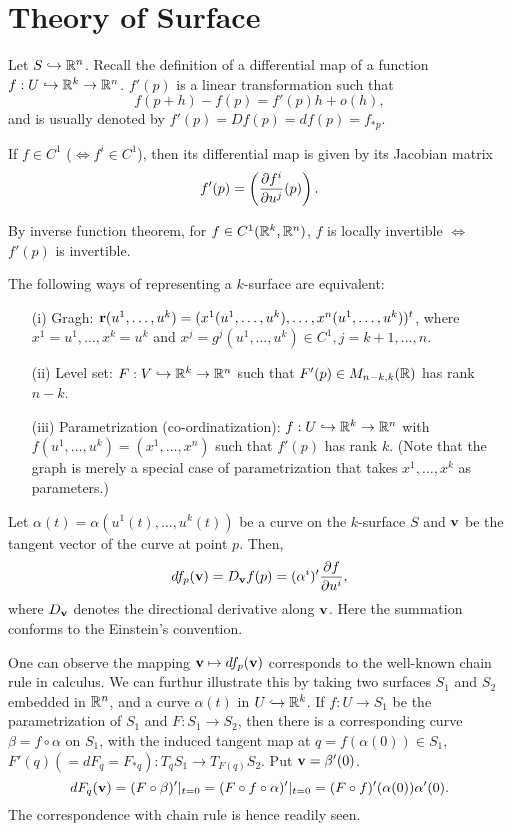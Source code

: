 \section{Theory of Surface}
Let $S \hookrightarrow \mathbb{R}^{n}$. Recall the definition of a differential map of a function $f: U \hookrightarrow \mathbb{R}^k \rightarrow \mathbb{R}^n$. $f'(p)$ is a linear transformation such that \[f(p+h) - f(p) = f'(p)h + o(h),\] and is usually denoted by $f'(p) = Df(p) = df(p) = f_{*p}$. 

\begin{fact}
	If $f \in C^{1}$ ($\iff f^i \in C^1$), then its differential map is given by its Jacobian matrix \[f'(p) = \left( \frac{ \partial f^i}{ \partial u^j }(p) \right).\]
\end{fact}

\begin{fact}
	By inverse function theorem, for $f \in C^1(\mathbb{R}^k, \mathbb{R}^n)$, $f$ is locally invertible $\iff$ $f'(p)$ is invertible.
\end{fact}

\begin{fact}
	The following ways of representing a $k$-surface are equivalent:
	\begin{enumerate}
		\item[(i)]Gragh: $\mathbf{r}(u^1, \dots, u^k) = (x^1(u^1,\dots,u^k), \dots, x^n(u^1,\dots,u^k))^t$, where $x^1 = u^1, \dots, x^k = u^k$ and $ x^j = g^j(u^1, \dots, u^k) \in C^1, j = k+1, \dots, n$.
		\item[(ii)]Level set: $F: V \hookrightarrow \mathbb{R}^k \rightarrow \mathbb{R}^n$ such that $F'(p) \in M_{n-k, k}(\mathbb{R})$ has rank $n-k$.
		\item[(iii)]Parametrization (co-ordinatization): $f:U \hookrightarrow \mathbb{R}^k \rightarrow \mathbb{R}^n$ with $f(u^1, \dots, u^k) = (x^1, \dots, x^n)$ such that $f'(p)$ has rank $k$. (Note that the graph is merely a special case of parametrization that takes $x^1, \dots, x^k$ as parameters.)
	\end{enumerate}
\end{fact}

\begin{fact}
	Let $\alpha(t) = \alpha(u^1(t), \dots, u^k(t))$ be a curve on the $k$-surface $S$ and $\mathbf{v}$ be the tangent vector of the curve at point $p$. Then,
	\[df_p(\mathbf{v}) = D_{\mathbf{v}}f(p) = (\alpha^i)'\frac{ \partial f}{ \partial u^i },\]
	where $D_{\mathbf{v}}$ denotes the directional derivative along $\mathbf{v}$. Here the summation conforms to the Einstein's convention. 
\end{fact}

One can observe the mapping $\mathbf{v} \mapsto df_p(\mathbf{v})$ corresponds to the well-known chain rule in calculus. We can furthur illustrate this by taking two surfaces $S_1$ and $S_2$ embedded in $\mathbb{R}^n$, and a curve $\alpha(t)$ in $U \hookrightarrow \mathbb{R}^k$. If $f:U \rightarrow S_1$ be the parametrization of $S_1$ and $F: S_1 \rightarrow S_2$, then there is a corresponding curve $\beta = f \circ \alpha$ on $S_1$, with the induced tangent map at $q=f(\alpha(0)) \in S_1$, $F'(q) (= dF_q = F_{*q}): T_qS_1 \rightarrow T_{F(q)}S_2$. Put $\mathbf{v} = \beta'(0)$. \[dF_{q}(\mathbf{v}) = (F \circ \beta)'|_{t = 0} = (F \circ f \circ \alpha)'|_{t = 0} = (F \circ f)'(\alpha(0)) \alpha'(0).\] The correspondence with chain rule is hence readily seen.

